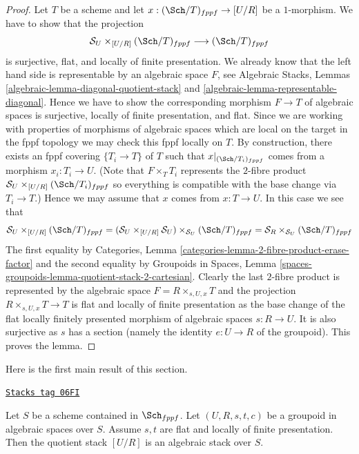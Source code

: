 \begin{proof}
Let $T$ be a scheme and let $x : (\Sch/T)_{fppf} \to [U/R]$
be a $1$-morphism. We have to show that the projection
$$
\mathcal{S}_U \times_{[U/R]} (\Sch/T)_{fppf}
\longrightarrow
(\Sch/T)_{fppf}
$$
is surjective, flat, and locally of finite presentation.
We already know that the left hand side
is representable by an algebraic space $F$, see
Algebraic Stacks, Lemmas \ref{algebraic-lemma-diagonal-quotient-stack} and
\ref{algebraic-lemma-representable-diagonal}.
Hence we have to show the corresponding morphism $F \to T$ of
algebraic spaces is surjective, locally of finite presentation, and flat.
Since we are working with properties of morphisms of algebraic
spaces which are local on the target in the fppf topology we
may check this fppf locally on $T$. By construction, there exists
an fppf covering $\{T_i \to T\}$ of $T$ such that
$x|_{(\Sch/T_i)_{fppf}}$ comes from a morphism
$x_i : T_i \to U$. (Note that $F \times_T T_i$ represents the
$2$-fibre product $\mathcal{S}_U \times_{[U/R]} (\Sch/T_i)_{fppf}$
so everything is compatible with the base change via $T_i \to T$.)
Hence we may assume that $x$ comes from $x : T \to U$.
In this case we see that
$$
\mathcal{S}_U \times_{[U/R]} (\Sch/T)_{fppf}
=
(\mathcal{S}_U \times_{[U/R]} \mathcal{S}_U)
\times_{\mathcal{S}_U} (\Sch/T)_{fppf}
=
\mathcal{S}_R \times_{\mathcal{S}_U} (\Sch/T)_{fppf}
$$
The first equality by
Categories, Lemma \ref{categories-lemma-2-fibre-product-erase-factor}
and the second equality by
Groupoids in Spaces,
Lemma \ref{spaces-groupoids-lemma-quotient-stack-2-cartesian}.
Clearly the last $2$-fibre product is represented by the algebraic
space $F = R \times_{s, U, x} T$ and the projection
$R \times_{s, U, x} T \to T$ is flat and locally of finite presentation
as the base change of the flat locally finitely presented
morphism of algebraic spaces $s : R \to U$.
It is also surjective as $s$ has a section (namely the identity
$e : U \to R$ of the groupoid).
This proves the lemma.
\end{proof}

Here is the first main result of this section.

\begin{theorem}
\label{criteria-theorem-flat-groupoid-gives-algebraic-stack}
\href{https://stacks.math.columbia.edu/tag/06FI}{\texttt{Stacks tag 06FI}}

Let $S$ be a scheme contained in $\Sch_{fppf}$.
Let $(U, R, s, t, c)$ be a groupoid in algebraic spaces over $S$.
Assume $s, t$ are flat and locally of finite presentation.
Then the quotient stack $[U/R]$ is an algebraic stack over $S$.
\end{theorem}

